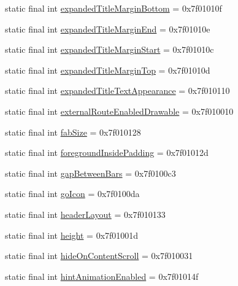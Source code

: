 \begin{CompactItemize}
\item 
static final int \hyperlink{classandroid_1_1support_1_1transition_1_1_r_1_1attr_785d6f23d632e68c6324d2e7fe92946c}{expandedTitleMarginBottom} = 0x7f01010f
\item 
static final int \hyperlink{classandroid_1_1support_1_1transition_1_1_r_1_1attr_f51364bcbff26d4e96fc31bfd198a6fb}{expandedTitleMarginEnd} = 0x7f01010e
\item 
static final int \hyperlink{classandroid_1_1support_1_1transition_1_1_r_1_1attr_5b040e931fadce4de0e0ea898422c5c0}{expandedTitleMarginStart} = 0x7f01010c
\item 
static final int \hyperlink{classandroid_1_1support_1_1transition_1_1_r_1_1attr_22fac8e0f488bac090c07d690a4f8a12}{expandedTitleMarginTop} = 0x7f01010d
\item 
static final int \hyperlink{classandroid_1_1support_1_1transition_1_1_r_1_1attr_ab677c89536a171bef2f456cf289e863}{expandedTitleTextAppearance} = 0x7f010110
\item 
static final int \hyperlink{classandroid_1_1support_1_1transition_1_1_r_1_1attr_1da151446a73b34510005f54f00f82c9}{externalRouteEnabledDrawable} = 0x7f010010
\item 
static final int \hyperlink{classandroid_1_1support_1_1transition_1_1_r_1_1attr_9764549661977499bdf6f43f64f5cc6e}{fabSize} = 0x7f010128
\item 
static final int \hyperlink{classandroid_1_1support_1_1transition_1_1_r_1_1attr_b4196f250dae90b0b447a82aec17ebf2}{foregroundInsidePadding} = 0x7f01012d
\item 
static final int \hyperlink{classandroid_1_1support_1_1transition_1_1_r_1_1attr_6f1c2de31f67baa9d9bce4ed5994e993}{gapBetweenBars} = 0x7f0100c3
\item 
static final int \hyperlink{classandroid_1_1support_1_1transition_1_1_r_1_1attr_824c5eeb6011ff1ec4840a8186815dd6}{goIcon} = 0x7f0100da
\item 
static final int \hyperlink{classandroid_1_1support_1_1transition_1_1_r_1_1attr_95312953e5de98f99270443e0de24c2a}{headerLayout} = 0x7f010133
\item 
static final int \hyperlink{classandroid_1_1support_1_1transition_1_1_r_1_1attr_b4fc8513fdf7b40ee541be5062ede392}{height} = 0x7f01001d
\item 
static final int \hyperlink{classandroid_1_1support_1_1transition_1_1_r_1_1attr_df5b7190c8aef4a9b33e193fd61f7ef0}{hideOnContentScroll} = 0x7f010031
\item 
static final int \hyperlink{classandroid_1_1support_1_1transition_1_1_r_1_1attr_ee249811c616d41df1099fa88924810c}{hintAnimationEnabled} = 0x7f01014f

\end{CompactItemize}
